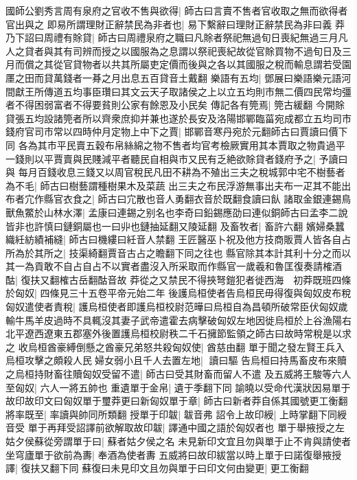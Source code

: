 國師公劉秀言周有泉府之官收不售與欲得|{
	師古曰言賣不售者官收取之無而欲得者官出與之}
即易所謂理財正辭禁民為非者也|{
	易下繫辭曰理財正辭禁民為非曰義}
莽乃下詔曰周禮有賖貸|{
	師古曰周禮泉府之職曰凡賖者祭祀無過旬日喪紀無過三月凡人之貸者與其有司辨而授之以國服為之息謂以祭祀喪紀故從官賖買物不過旬日及三月而償之其從官貸物者以共其所屬吏定價而後與之各以其國服之稅而輸息謂若受園㕓之田而貸萬錢者一朞之月出息五百貸音土戴翻}
樂語有五均|{
	鄧展曰樂語樂元語河間獻王所傳道五均事臣瓚曰其文云天子取諸侯之上以立五均則市無二價四民常均彊者不得困弱富者不得要貧則公家有餘恩及小民矣}
傳記各有筦焉|{
	筦古緩翻}
今開賖貸張五均設諸筦者所以齊衆庶抑并兼也遂於長安及洛陽邯鄲臨菑宛成都立五均司市錢府官司市常以四時仲月定物上中下之賈|{
	邯鄲音寒丹宛於元翻師古曰賈讀曰價下同}
各為其市平民賣五穀布帛絲綿之物不售者均官考檢厥實用其本賈取之物貴過平一錢則以平賈賣與民賤減平者聽民自相與市又民有乏絶欲賖貸者錢府予之|{
	予讀曰與}
每月百錢收息三錢又以周官稅民凡田不耕為不殖出三夫之稅城郭中宅不樹藝者為不毛|{
	師古曰樹藝謂種樹果木及菜蔬}
出三夫之布民浮游無事出夫布一疋其不能出布者宂作縣官衣食之|{
	師古曰宂散也音人勇翻衣音於既翻食讀曰飤}
諸取金銀連錫鳥獸魚鱉於山林水澤|{
	孟康曰連錫之别名也李奇曰鉛錫應劭曰連似銅師古曰孟李二說皆非也許慎曰鏈銅屬也一曰丱也鏈抽延翻又陵延翻}
及畜牧者|{
	畜許六翻}
嬪婦桑蠶織紝紡績補縫|{
	師古曰機縷曰紝音人禁翻}
王匠醫巫卜祝及他方技商販賈人皆各自占所為於其所之|{
	技渠綺翻賈音古占之瞻翻下同之往也}
縣官除其本計其利十分之而以其一為貢敢不自占自占不以實者盡沒入所采取而作縣官一歲羲和魯匡復奏請榷酒酤|{
	復扶又翻榷古岳翻酤音故}
莽從之又禁民不得挾弩鎧犯者徙西海　初莽既班四條於匈奴|{
	四條見三十五卷平帝元始二年}
後護烏桓使者告烏桓民毋得復與匈奴皮布稅匈奴遣使者責稅|{
	護烏桓使者即護烏桓校尉范曄曰烏桓自為昌頓所破常臣伏匈奴歲輸牛馬羊皮過時不具輒沒其妻子武帝遣霍去病擊破匈奴左地因徙烏桓於上谷漁陽右北平遼西遼東五郡塞外後置護烏桓校尉秩二千石擁節監領之師古曰故時常稅是以求之}
收烏桓酋豪縛倒懸之酋豪兄弟怒共殺匈奴使|{
	酋慈由翻}
單于聞之發左賢王兵入烏桓攻擊之頗殺人民婦女弱小且千人去置左地|{
	讀曰驅}
告烏桓曰持馬畜皮布來贖之烏桓持財畜往贖匈奴受留不遣|{
	師古曰受其財畜而留人不遣}
及五威將王駿等六人至匈奴|{
	六人一將五帥也}
重遺單于金帛|{
	遺于季翻下同}
諭曉以受命代漢狀因易單于故印故印文曰匈奴單于璽莽更曰新匈奴單于章|{
	師古曰新者莽自係其國號更工衡翻}
將率既至|{
	率讀與帥同所類翻}
授單于印韍|{
	韍音弗}
詔令上故印綬|{
	上時掌翻下同綬音受}
單于再拜受詔譯前欲解取故印韍|{
	譯通中國之語於匈奴者也}
單于舉掖授之左姑夕侯蘇從旁謂單于曰|{
	蘇者姑夕侯之名}
未見新印文宜且勿與單于止不肯與請使者坐穹廬單于欲前為夀|{
	奉酒為使者夀}
五威將曰故印紱當以時上單于曰諾復舉掖授譯|{
	復扶又翻下同}
蘇復曰未見印文且勿與單于曰印文何由變更|{
	更工衡翻}
